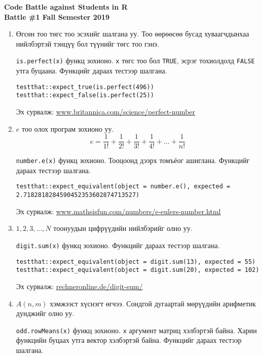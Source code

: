 \documentclass[11pt]{letter}
\begin{document}
\begin{center}
\bfseries
\Large Code Battle against Students in R \\
\large Battle \#1 Fall Semester 2019
\end{center}
\begin{enumerate}
\item Өгсөн тоо төгс тоо эсэхийг шалгана уу. Тоо өөрөөсөө бусад хуваагчдынхаа нийлбэртэй тэнцүү бол түүнийг төгс тоо гэнэ.
\par
\lstinline[otherkeywords={is.perfect}]|is.perfect(x)| функц зохионо. \lstinline|x| төгс тоо бол \lstinline|TRUE|, эсрэг тохиолдолд \lstinline|FALSE| утга буцаана. Функцийг дараах тестээр шалгана.
\begin{lstlisting}[otherkeywords={is.perfect,expect_true,expect_false}]
testthat::expect_true(is.perfect(496))
testthat::expect_false(is.perfect(25))
\end{lstlisting}
Эх сурвалж: \href{https://www.britannica.com/science/perfect-number}{www.britannica.com/science/perfect-number}
\item $e$ тоо олох програм зохионо уу. $$e=\frac{1}{1!}+\frac{1}{2!}+\frac{1}{3!}+\frac{1}{4!}+\ldots+\frac{1}{n!}$$
\par
\lstinline[otherkeywords={number.e}]|number.e(x)| функц зохионо. Тооцоонд дээрх томъёог ашиглана. Функцийг дараах тестээр шалгана.
\begin{lstlisting}[otherkeywords={number.e,expect_equivalent}]
testthat::expect_equivalent(object = number.e(), expected = 2.7182818284590452353602874713527)
\end{lstlisting}
Эх сурвалж: \href{https://www.mathsisfun.com/numbers/e-eulers-number.html}{www.mathsisfun.com/numbers/e-eulers-number.html}
\item $1,2,3,\ldots,N$ тоонуудын цифрүүдийн нийлбэрийг олно уу.
\par
\lstinline[otherkeywords={digit.sum}]|digit.sum(x)| функц зохионо. Функцийг дараах тестээр шалгана.
\begin{lstlisting}[otherkeywords={digit.sum,expect_equivalent}]
testthat::expect_equivalent(object = digit.sum(13), expected = 55)
testthat::expect_equivalent(object = digit.sum(20), expected = 102)
\end{lstlisting}
Эх сурвалж: \href{https://rechneronline.de/digit-sum/}{rechneronline.de/digit-sum/}
\item $A(n,m)$ хэмжээст хүснэгт өгчээ. Сондгой дугаартай мөрүүдийн арифметик дунджийг олно уу.
\par
\lstinline[otherkeywords={odd.rowMeans}]|odd.rowMeans(x)| функц зохионо. \lstinline|x| аргумент матриц хэлбэртэй байна. Харин функцийн буцаах утга вектор хэлбэртэй байна. Функцийг дараах тестээр шалгана.

\end{enumerate}
\end{document}
